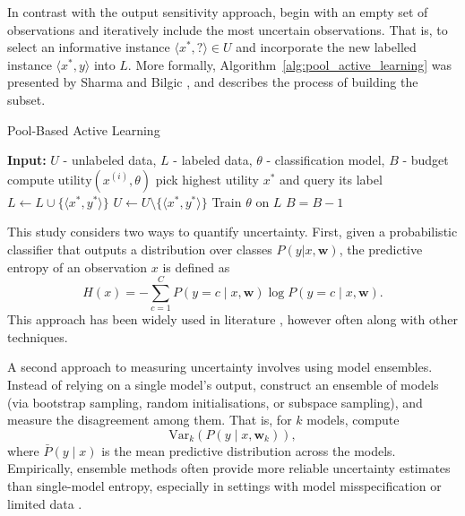 \documentclass[10pt, conference]{IEEEtran}
\begin{document}
In contrast with the output sensitivity approach, begin with an empty set of observations and iteratively include the most uncertain observations. That is, to select an informative instance $\langle x^{*}, ? \rangle \in U$ and incorporate the new labelled instance $\langle x^{*}, y \rangle$ into $L$. More formally, Algorithm~\ref{alg:pool_active_learning} was presented by Sharma and Bilgic \cite{alus}, and describes the process of building the subset.


\begin{algorithm}
	\caption{Pool-Based Active Learning}
	\label{alg:pool_active_learning}
	\begin{algorithmic}[1]
		\State \textbf{Input:} $U$ - unlabeled data, $L$ - labeled data, $\theta$ - classification model, $B$ - budget
		\Repeat
		\State compute $\text{utility}(x^{(i)}, \theta)$
		\EndFor
		\State pick highest utility $x^*$ and query its label
		\State $L \leftarrow L \cup \{\langle x^*, y^* \rangle\}$
		\State $U \leftarrow U \setminus \{\langle x^*, y^* \rangle\}$
		\State Train $\theta$ on $L$
		\State $B = B - 1$
	\end{algorithmic}
\end{algorithm}

This study considers two ways to quantify uncertainty. First, given a probabilistic classifier that outputs a distribution over classes $P(y|x, \mathbf{w})$, the predictive entropy of an observation $x$ is defined as
\begin{equation}
H(x) = - \sum_{c=1}^{C} P(y=c \mid x, \mathbf{w}) \log P(y=c \mid x, \mathbf{w}).
\label{eq:entropy}
\end{equation}
This approach has been widely used in literature \cite{e1, e2, e3}, however often along with other techniques.

A second approach to measuring uncertainty involves using model ensembles. Instead of relying on a single model's output, construct an ensemble of models (via bootstrap sampling, random initialisations, or subspace sampling), and measure the disagreement among them. That is, for $k$ models, compute
\begin{equation}
\mathrm{Var}_{k}(P(y \mid x, \mathbf{w}_k)),
\label{eq:var-e}
\end{equation}
where $\bar P(y \mid x)$ is the mean predictive distribution across the models. Empirically, ensemble methods often provide more reliable uncertainty estimates than single-model entropy, especially in settings with model misspecification or limited data \cite{Yin2023_uncertainty_active_learning}.
\end{document}
